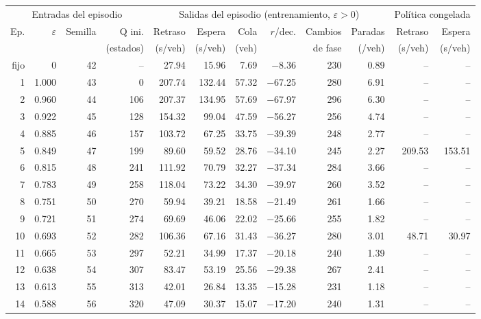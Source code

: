 \begin{table}[H]
\centering
\scriptsize
\setlength{\tabcolsep}{3pt}
\begin{tabular}{rrrrrrrrrrrr}
\toprule
\multicolumn{4}{c}{Entradas del episodio} & \multicolumn{6}{c}{Salidas del episodio (entrenamiento, $\varepsilon>0$)} & \multicolumn{2}{c}{Política congelada} \\
\cmidrule(lr){1-4}\cmidrule(lr){5-10}\cmidrule(lr){11-12}
Ep. & $\varepsilon$ & Semilla & Q ini. & Retraso & Espera & Cola & $r$/dec. & Cambios & Paradas & Retraso & Espera \\
 &  &  & (estados) & (s/veh) & (s/veh) & (veh) &  & de fase & (/veh) & (s/veh) & (s/veh) \\
\midrule
fijo & 0 & 42 & -- & 27.94 & 15.96 & 7.69 & $-$8.36 & 230 & 0.89 & -- & -- \\
\midrule
1 & 1.000 & 43 & 0 & 207.74 & 132.44 & 57.32 & $-$67.25 & 280 & 6.91 & -- & -- \\
2 & 0.960 & 44 & 106 & 207.37 & 134.95 & 57.69 & $-$67.97 & 296 & 6.30 & -- & -- \\
3 & 0.922 & 45 & 128 & 154.32 & 99.04 & 47.59 & $-$56.27 & 256 & 4.74 & -- & -- \\
4 & 0.885 & 46 & 157 & 103.72 & 67.25 & 33.75 & $-$39.39 & 248 & 2.77 & -- & -- \\
5 & 0.849 & 47 & 199 & 89.60 & 59.52 & 28.76 & $-$34.10 & 245 & 2.27 & 209.53 & 153.51 \\
6 & 0.815 & 48 & 241 & 111.92 & 70.79 & 32.27 & $-$37.34 & 284 & 3.66 & -- & -- \\
7 & 0.783 & 49 & 258 & 118.04 & 73.22 & 34.30 & $-$39.97 & 260 & 3.52 & -- & -- \\
8 & 0.751 & 50 & 270 & 59.94 & 39.21 & 18.58 & $-$21.49 & 261 & 1.66 & -- & -- \\
9 & 0.721 & 51 & 274 & 69.69 & 46.06 & 22.02 & $-$25.66 & 255 & 1.82 & -- & -- \\
10 & 0.693 & 52 & 282 & 106.36 & 67.16 & 31.43 & $-$36.27 & 280 & 3.01 & 48.71 & 30.97 \\
11 & 0.665 & 53 & 297 & 52.21 & 34.99 & 17.37 & $-$20.18 & 240 & 1.39 & -- & -- \\
12 & 0.638 & 54 & 307 & 83.47 & 53.19 & 25.56 & $-$29.38 & 267 & 2.41 & -- & -- \\
13 & 0.613 & 55 & 313 & 42.01 & 26.84 & 13.35 & $-$15.28 & 231 & 1.18 & -- & -- \\
14 & 0.588 & 56 & 320 & 47.09 & 30.37 & 15.07 & $-$17.20 & 240 & 1.31 & -- & -- \\

\end{tabular}
\end{table}
